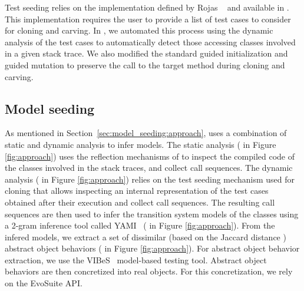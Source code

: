 Test seeding relies on the implementation defined by Rojas \etal~\cite{Rojas2016} and available in \evosuite. This implementation requires the user to provide a list of test cases to consider for cloning and carving. In \botsing, we automated this process using the dynamic analysis of the test cases to automatically detect those accessing classes involved in a given stack trace. We also modified the standard guided initialization and guided mutation to preserve the call to the target method during cloning and carving.

\subsection{Model seeding}

As mentioned in Section~\ref{sec:model_seeding:approach}, \botsing uses a combination of static and dynamic analysis to infer models. The static analysis ( in Figure \ref{fig:approach}) uses the reflection mechanisms of \evosuite to inspect the compiled code of the classes involved in the stack traces, and collect call sequences. The dynamic analysis ( in Figure \ref{fig:approach}) relies on the test seeding mechanism used for cloning that allows inspecting an internal representation of the test cases obtained after their execution and collect call sequences.
%
The resulting call sequences are then used to infer the transition system models of the classes using a 2-gram inference tool called YAMI~\cite{Devroey2017b} ( in Figure \ref{fig:approach}).
From the infered models, we extract a set of dissimilar (based on the Jaccard distance \cite{Jaccard1901}) abstract object behaviors ( in Figure \ref{fig:approach}). For abstract object behavior extraction, we use the VIBeS~\cite{Devroey2016} model-based testing tool.
%
Abstract object behaviors are then concretized into real objects. For this concretization, we rely on the EvoSuite API.


